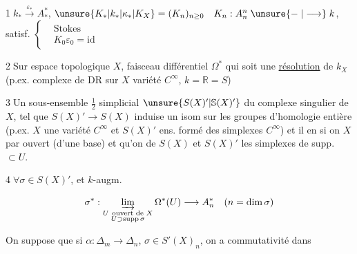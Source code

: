 
\textcircled{1}\quad $k_*\xrightarrow{\varepsilon_*}A_*^*$, $\unsure{K_*|k_*|\kappa_*|K_X}=(K_n)_{n\geq0}\quad K_n:A^n_n\mathrel{\unsure{\relbar|\longrightarrow}} k$, satisf. $\left\{\begin{aligned}&\text{Stokes}\\&K_0\varepsilon_0=\mathrm{id}\end{aligned}\right.$

\textcircled{2}\quad Sur  espace topologique $X$, faisceau différentiel   $\Omega^*$ qui soit une \uline{résolution} de $k_X$ (p.ex. complexe de DR sur $X$ variété $C^\infty$, $k=\mathbb{R}=S$)

\textcircled{3}\quad Un sous-ensemble $\frac{1}{2}$ simplicial $\unsure{S(X)'|\mathbb S(X)'}$ du complexe singulier de $X$, tel que $S(X)'\longrightarrow S(X)$  induise un isom sur les groupes d'homologie entière (p.ex. $X$ une variété $C^\infty$ et $S(X)'$ ens. formé des simplexes $C^\infty$) et il en  si on   $X$ par ouvert (d'une base) et qu'on  de $S(X)$ et $S(X)'$ les simplexes de supp. $\subset U$.


\textcircled{4}\quad $\forall\sigma\in S(X)'$, et   $k$-augm.

\[
\sigma^*:\varinjlim_{\substack{U\ \text{ouvert de }X\\ U\supset\operatorname{supp}\sigma}}\Omega^*(U)\longrightarrow A_n^*
\quad(n=\dim\sigma)
\]

On suppose que si $\alpha:\Delta_m\longrightarrow\Delta_n$, $\sigma\in S'(X)_n$,  on a commutativité dans


